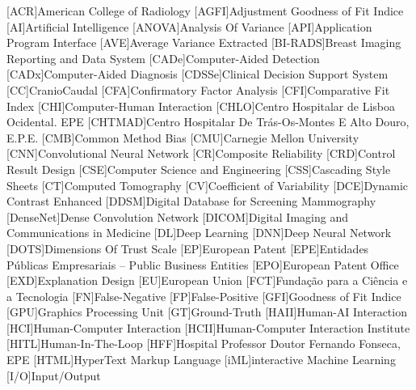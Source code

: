 
\begin{acronym}[H.264/SVC]
[ACR]{American College of Radiology}
[AGFI]{Adjustment Goodness of Fit Indice}
[AI]{Artificial Intelligence}
[ANOVA]{Analysis Of Variance}
[API]{Application Program Interface}
[AVE]{Average Variance Extracted}
[BI-RADS]{Breast Imaging Reporting and Data System}
[CADe]{Computer-Aided Detection}
[CADx]{Computer-Aided Diagnosis}
[CDSSe]{Clinical Decision Support System}
[CC]{CranioCaudal}
[CFA]{Confirmatory Factor Analysis}
[CFI]{Comparative Fit Index}
[CHI]{Computer-Human Interaction}
[CHLO]{Centro Hospitalar de Lisboa Ocidental. EPE}
[CHTMAD]{Centro Hospitalar De Tr\'{a}s-Os-Montes E Alto Douro, E.P.E.}
[CMB]{Common Method Bias}
[CMU]{Carnegie Mellon University}
[CNN]{Convolutional Neural Network}
[CR]{Composite Reliability}
[CRD]{Control Result Design}
[CSE]{Computer Science and Engineering}
[CSS]{Cascading Style Sheets}
[CT]{Computed Tomography}
[CV]{Coefficient of Variability}
[DCE]{Dynamic Contrast Enhanced}
[DDSM]{Digital Database for Screening Mammography}
[DenseNet]{Dense Convolution Network}
[DICOM]{Digital Imaging and Communications in Medicine}
[DL]{Deep Learning}
[DNN]{Deep Neural Network}
[DOTS]{Dimensions Of Trust Scale}
[EP]{European Patent}
[EPE]{Entidades Públicas Empresariais -- Public Business Entities}
[EPO]{European Patent Office}
[EXD]{Explanation Design}
[EU]{European Union}
[FCT]{Funda\c{c}\~{a}o para a Ci\^{e}ncia e a Tecnologia}
[FN]{False-Negative}
[FP]{False-Positive}
[GFI]{Goodness of Fit Indice}
[GPU]{Graphics Processing Unit}
[GT]{Ground-Truth}
[HAII]{Human-AI Interaction}
[HCI]{Human-Computer Interaction}
[HCII]{Human-Computer Interaction Institute}
[HITL]{Human-In-The-Loop}
[HFF]{Hospital Professor Doutor Fernando Fonseca, EPE}
[HTML]{HyperText Markup Language}
[iML]{interactive Machine Learning}
[I/O]{Input/Output}

\end{acronym}
